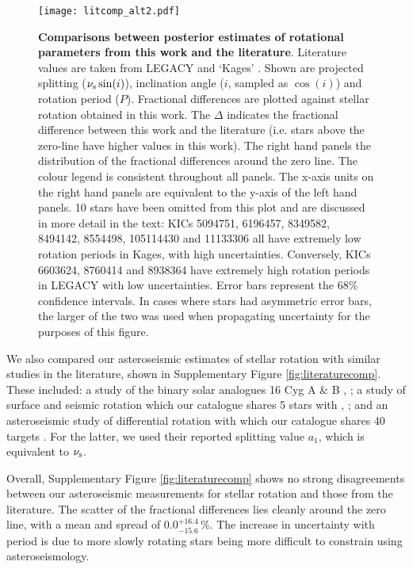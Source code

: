 \begin{figure}[h!]
	\centering
	\texttt{[image: litcomp\_alt2.pdf]}
	\caption{\textbf{Comparisons between posterior estimates of rotational parameters from this work and the literature}. Literature values are taken from LEGACY and `Kages' \cite[private communication]{davies+2016, lund+2017}. Shown are projected splitting ($\nu_{\rm s}\sin(i)$), inclination angle ($i$, sampled as $\cos(i)$) and rotation period ($P$). Fractional differences are plotted against stellar rotation obtained in this work. The $\Delta$ indicates the fractional difference between this work and the literature (i.e. stars above the zero-line have higher values in this work). The right hand panels the distribution of the fractional differences around the zero line. The colour legend is consistent throughout all panels. The x-axis units on the right hand panels are equivalent to the y-axis of the left hand panels. 10 stars have been omitted from this plot and are discussed in more detail in the text: KICs 5094751, 6196457, 8349582, 8494142, 8554498, 105114430 and 11133306 all have extremely low rotation periods in Kages, with high uncertainties. Conversely, KICs 6603624, 8760414 and 8938364 have extremely high rotation periods in LEGACY with low uncertainties. Error bars represent the 68\% confidence intervals. In cases where stars had asymmetric error bars, the larger of the two was used when propagating uncertainty for the purposes of this figure.}
	\label{fig:legacykages}
\end{figure}

We also compared our asteroseismic estimates of stellar rotation with similar studies in the literature, shown in Supplementary Figure \ref{fig:literaturecomp}. These included: a study of the binary solar analogues 16 Cyg A \& B \cite{davies+2015}, ; a study of surface and seismic rotation which our catalogue shares 5 stars with \cite{nielsen+2015}, ; and an asteroseismic study of differential rotation with which our catalogue shares 40 targets \cite{benomar+2018}. For the latter, we used their reported splitting value $a_1$, which is equivalent to $\nu_{\rm s}$. 

Overall,  Supplementary Figure \ref{fig:literaturecomp} shows no strong disagreements between our asteroseismic measurements for stellar rotation and those from the literature. The scatter of the fractional differences lies cleanly around the zero line, with a mean and spread of $0.0_{-15.6}^{+16.4}\, \%$. The increase in uncertainty with period is due to more slowly rotating stars being more difficult to constrain using asteroseismology.

